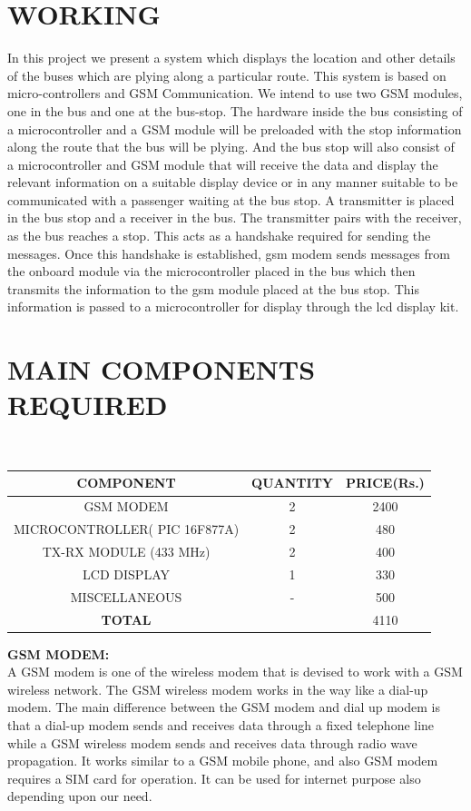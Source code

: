 \documentclass[12pt,a4paper,oneside]{report}
\begin{document}
\begin{onehalfspacing}
\section{WORKING}
\par
\hspace{.7cm}
In this project we present a system which displays the location and other details of the buses which are plying along a particular route. This system is based on micro-controllers and GSM Communication. We intend to use two GSM modules, one in the bus and one at the bus-stop. The hardware inside the bus consisting of a microcontroller and a GSM module will be preloaded with the stop information along the route that the bus will be plying. And the bus stop will also consist of a microcontroller and GSM module that will receive the data and display the relevant information on a suitable display device or in any manner suitable to be communicated with a passenger waiting at the bus stop.
   A transmitter is placed in the bus stop and a receiver in the bus. The transmitter pairs with the receiver, as the bus reaches a stop. This acts as a handshake required for sending the messages. Once this handshake is established, gsm modem sends messages from the onboard module via the microcontroller placed in the bus which then transmits the information to the gsm module placed at the bus stop. This information is passed to a microcontroller for display through the lcd display kit. 

\section{MAIN COMPONENTS REQUIRED}
{$\;\;\;\;$}	
\begin{table}[h]
\begin{tabular}{|c|c|c|}
\hline
\textbf{COMPONENT} & \textbf{QUANTITY} & \textbf{PRICE(Rs.)}\\
\hline
GSM MODEM & 2 & 2400\\
MICROCONTROLLER( PIC 16F877A) & 2 & 480\\
TX-RX MODULE (433 MHz) & 2 & 400\\
LCD DISPLAY & 1 & 330\\
MISCELLANEOUS	& - & 500\\
\hline
\textbf{TOTAL}	& & 4110\\
\hline

\end{tabular}
\end{table}

\textbf{GSM MODEM:}\\
A GSM modem is one of the wireless modem that is devised to work with a GSM wireless network. The GSM wireless modem works in the way like a dial-up modem. The main difference between the GSM modem and dial up modem is that a dial-up modem sends and receives data through a fixed telephone line while a GSM wireless modem sends and receives data through radio wave propagation.  It works similar to a GSM mobile phone, and also GSM modem requires a SIM card for operation. It can be used for internet purpose also depending upon our need.\\


\end{onehalfspacing}
\end{document}
